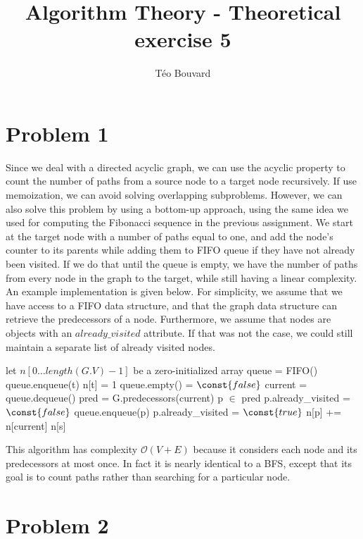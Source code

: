 \documentclass[a4paper, 10pt, twoside]{article}
\begin{document}
\title{Algorithm Theory - Theoretical exercise 5}
\author{T\'eo Bouvard}
\maketitle

\section*{Problem 1}

Since we deal with a directed acyclic graph, we can use the acyclic property to count the number of paths from a source node to a target node recursively. If use memoization, we can avoid solving overlapping subproblems. However, we can also solve this problem by using a bottom-up approach, using the same idea we used for computing the Fibonacci sequence in the previous assignment.
We start at the target node with a number of paths equal to one, and add the node's counter to its parents while adding them to FIFO queue if they have not already been visited. If we do that until the queue is empty, we have the number of paths from every node in the graph to the target, while still having a linear complexity. An example implementation is given below. For simplicity, we assume that we have access to a FIFO data structure, and that the graph data structure can retrieve the predecessors of a node. Furthermore, we assume that nodes are objects with an $already\_visited$ attribute. If that was not the case, we could still maintain a separate list of already visited nodes.

\begin{codebox}
	\zi let $n[0 \ldots length(G.V) - 1]$ be a zero-initialized array
	\zi queue = FIFO()
	\zi queue.enqueue(t)
	\zi n[t] = 1
	\zi \While queue.empty() = $\const{false}$ \Do
	\zi current = queue.dequeue()
	\zi pred = G.predecessors(current)
	\zi \For p $\in$ pred \Do
	\zi \If p.already\_visited = $\const{false}$ \Do
	\zi queue.enqueue(p)
	\zi p.already\_visited = $\const{true}$ \End
	\zi n[p] += n[current] \End \End
	\zi \Return n[s] \End
\end{codebox}

This algorithm has complexity $\mathcal{O}(V+E)$ because it considers each node and its predecessors at most once. In fact it is nearly identical to a BFS, except that its goal is to count paths rather than searching for a particular node.

\section*{Problem 2}
\end{document}
